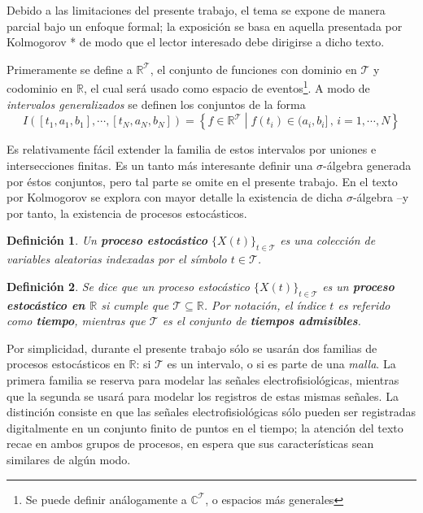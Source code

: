 \documentclass[12pt,letterpaper]{book}
\newtheorem{definicion}{Definición}[chapter]
\newcommand{\R}{\mathbb{R}}
\newcommand{\C}{\mathbb{C}}
\newcommand{\xt}{$\{X(t)\}_{t\in \mathcal{T}}$ }
\newcommand{\talque}{\mathrel{}\middle|\mathrel{}}
\begin{document}
Debido a las limitaciones del presente trabajo, el tema se expone de manera parcial bajo un enfoque formal; la exposición se basa en aquella presentada por Kolmogorov *%
 de modo que el lector interesado debe dirigirse a dicho texto.

Primeramente se define a $\R^{\mathcal{T}}$, el conjunto de funciones con dominio en $\mathcal{T}$ y codominio en $\R$, el cual será usado como espacio de eventos\footnote{Se puede definir análogamente a $\C^{\mathcal{T}}$, o espacios más generales}. 
%
A modo de \textit{intervalos generalizados} se definen los conjuntos de la forma
\begin{equation}
I\left( [t_1, a_1, b_1], \cdots, [t_N, a_N, b_N] \right) = 
\left\{ f \in \R^{\mathcal{T}} \talque f(t_i) \in (a_i, b_i] \, , \, i = 1, \cdots, N \right\}
\end{equation}

Es relativamente fácil extender la familia de estos intervalos por uniones e intersecciones finitas. Es un tanto más interesante definir una $\sigma$-álgebra generada por éstos conjuntos, pero tal parte se omite en el presente trabajo.
%
En el texto por Kolmogorov se explora con mayor detalle la existencia de dicha $\sigma$-álgebra --y por tanto, la existencia de procesos estocásticos.

\begin{definicion}
Un \textbf{proceso estocástico} \xt es una colección de variables aleatorias indexadas por el símbolo $t\in\mathcal{T}$.
\end{definicion}

\begin{definicion}
Se dice que un proceso estocástico \xt es un \textbf{proceso estocástico en $\R$} si cumple que $\mathcal{T} \subseteq \R$.
%
Por notación, el índice $t$ es referido como \textbf{tiempo}, mientras que $\mathcal{T}$ es el conjunto de \textbf{tiempos admisibles}.
\end{definicion}

Por simplicidad, durante el presente trabajo sólo se usarán dos familias de procesos estocásticos en $\R$: si $\mathcal{T}$ es un intervalo, o si es parte de una \textit{malla}. 
%
La primera familia se reserva para modelar las señales electrofisiológicas, mientras que la segunda se usará para modelar los registros de estas mismas señales.
%
La distinción consiste en que las señales electrofisiológicas sólo pueden ser registradas digitalmente en un conjunto finito de puntos en el tiempo; la atención del texto recae en ambos grupos de procesos, en espera que sus características sean similares de algún modo.
\end{document}
